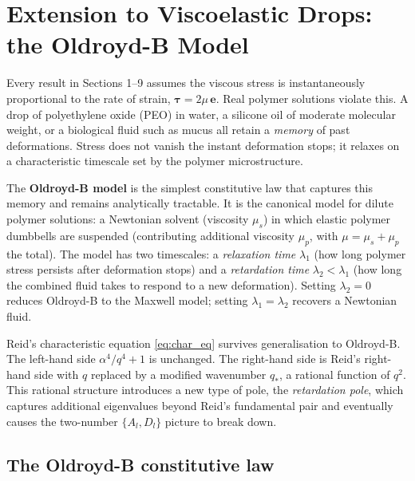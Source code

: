 \section{Extension to Viscoelastic Drops: the Oldroyd-B Model}
\label{sec:oldroydB}

Every result in Sections 1--9 assumes the viscous stress is instantaneously proportional to the rate of strain,
$\boldsymbol{\tau} = 2\mu\,\mathbf{e}$. Real polymer solutions violate this.
A drop of polyethylene oxide (PEO) in water, a silicone oil of moderate
molecular weight, or a biological fluid such as mucus all retain a
\emph{memory} of past deformations. Stress does not vanish the instant
deformation stops; it relaxes on a characteristic timescale set by the
polymer microstructure.

The \textbf{Oldroyd-B model} is the simplest constitutive law that captures
this memory and remains analytically tractable. It is the
canonical model for dilute polymer solutions: a Newtonian solvent (viscosity
$\mu_s$) in which elastic polymer dumbbells are suspended (contributing
additional viscosity $\mu_p$, with $\mu = \mu_s + \mu_p$ the total). The
model has two timescales: a \emph{relaxation time} $\lambda_1$ (how long
polymer stress persists after deformation stops) and a \emph{retardation
time} $\lambda_2 < \lambda_1$ (how long the combined fluid takes to respond
to a new deformation). Setting $\lambda_2 = 0$ reduces Oldroyd-B to the
Maxwell model; setting $\lambda_1 = \lambda_2$ recovers a Newtonian fluid.

Reid's characteristic equation \eqref{eq:char_eq} survives generalisation
to Oldroyd-B. The left-hand side $\alpha^4/q^4 + 1$ is unchanged. The
right-hand side is Reid's right-hand side with $q$ replaced by a modified
wavenumber $q_*$, a rational function of $q^2$. This rational structure
introduces a new type of pole, the \emph{retardation pole}, which captures
additional eigenvalues beyond Reid's fundamental pair and eventually causes
the two-number $\{A_l, D_l\}$ picture to break down.

\subsection{The Oldroyd-B constitutive law}

